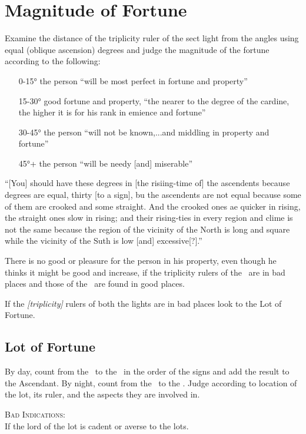 \section{Magnitude of Fortune}

Examine the distance of the triplicity ruler of the sect light from the angles using equal (oblique ascension) degrees and judge the magnitude of the fortune according to the following:
\begin{itemize}[topsep=0em,itemsep=0em]
\item[0-15°] the person ``will be most perfect in fortune and property''
\item[15-30°] good fortune and property, ``the nearer to the degree of the cardine, the higher it is for his rank in emience and fortune''
\item[30-45°] the person ``will not be known,...and middling in property and fortune''
\item[45°+]  the person ``will be needy [and] miserable''
\end{itemize}

``[You] should have these degrees in [the risiing-time of] the ascendents because degrees are equal, thirty [to a sign], bu the ascendents are not equal because some of them are crooked and some straight. And the crooked ones ae quicker in rising, the straight ones slow in rising; and their rising-ties in every region and clime is not the same because the region of the vicinity of the North is long and square while the vicinity of the Suth is low [and] excessive[?].''

There is no good or pleasure for the person in his property, even though he thinks it might be good and increase, if the triplicity rulers of the \Sun\, are in bad places and those of the \Moon\, are found in good places. 

If the \textsl{[triplicity]} rulers of both the lights are in bad places look to the Lot of Fortune.

\subsection{Lot of Fortune}
By day, count from the \Sun\, to the \Moon\, in the order of the signs and add the result to the Ascendant. By night, count from the \Moon\, to the \Sun. Judge according to location of the lot, its ruler, and the aspects they are involved in.

\noindent\textsc{Bad Indications:} \hfill \\
If the lord of the lot is cadent or averse to the lots.


